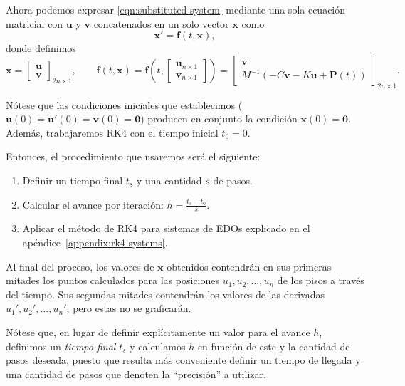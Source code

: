 Ahora podemos expresar \eqref{eqn:substituted-system} mediante una sola ecuación matricial con \(\mathbf{u}\) y \(\mathbf{v}\) concatenados en un solo vector \(\mathbf{x}\) como
\begin{equation}\label{eqn:rk4-ready}
    \mathbf{x}' = \mathbf{f}(t, \mathbf{x})
,\end{equation}
donde definimos
\[
    \mathbf{x} = \begin{bmatrix} \mathbf{u} \\ \mathbf{v} \end{bmatrix}_{2n \times 1},
    \qquad
    \mathbf{f}(t, \mathbf{x}) = \mathbf{f}\left(t, \begin{bmatrix} \mathbf{u}_{n \times 1} \\ \mathbf{v}_{n \times 1} \end{bmatrix}\right) = \begin{bmatrix}
        \mathbf{v} \\
        M^{-1}(-C\mathbf{v} - K\mathbf{u} + \mathbf{P}(t))
    \end{bmatrix}_{2n \times 1}
.\]

Nótese que las condiciones iniciales que establecimos (\(\mathbf{u}(0) = \mathbf{u}'(0) = \mathbf{v}(0) = \mathbf{0}\)) producen en conjunto la condición \(\mathbf{x}(0) = \mathbf{0}\). Además, trabajaremos RK4 con el tiempo inicial \(t_0 = 0\).

Entonces, el procedimiento que usaremos será el siguiente:

\begin{enumerate}
    \item Definir un tiempo final \(t_s\) y una cantidad \(s\) de pasos.
    \item Calcular el avance por iteración: \(h = \frac{t_s - t_0}{s}\).
    \item Aplicar el método de RK4 para sistemas de EDOs explicado en el apéndice~\ref{appendix:rk4-systems}.
\end{enumerate}

Al final del proceso, los valores de \(\mathbf{x}\) obtenidos contendrán en sus primeras mitades los puntos calculados para las posiciones \(u_1, u_2, \ldots, u_n\) de los pisos a través del tiempo. Sus segundas mitades contendrán los valores de las derivadas \(u_1', u_2', \ldots, u_n'\), pero estas no se graficarán.

Nótese que, en lugar de definir explícitamente un valor para el avance \(h\), definimos un \textit{tiempo final} \(t_s\) y calculamos \(h\) en función de este y la cantidad de pasos deseada, puesto que resulta más conveniente definir un tiempo de llegada y una cantidad de pasos que denoten la ``precisión'' a utilizar.


